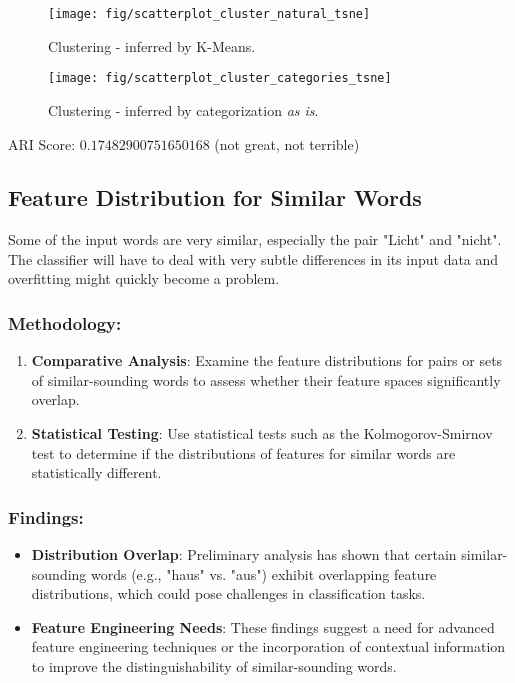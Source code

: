 \begin{figure}[!ht]
	\centering
	\begin{minipage}{0.49\textwidth}
		\centering
		\texttt{[image: fig/scatterplot\_cluster\_natural\_tsne]}
		\caption{Clustering - inferred by K-Means.}
		\label{fig:ClusterNatural}
	\end{minipage}\hfill
	\begin{minipage}{0.49\textwidth}
		\centering
		\texttt{[image: fig/scatterplot\_cluster\_categories\_tsne]}
		\caption{Clustering - inferred by categorization \textit{as is}.}
		\label{fig:ClusterCategorized}
	\end{minipage}
\end{figure}
ARI Score: $0.17482900751650168$ (not great, not terrible)

\subsection{Feature Distribution for Similar Words}

Some of the input words are very similar, especially the pair "Licht" and "nicht". The classifier will have to deal with very subtle differences in its input data and overfitting might quickly become a problem.

\subsubsection{Methodology:}

\begin{enumerate}
    \item \textbf{Comparative Analysis}: Examine the feature distributions for pairs or sets of similar-sounding words to assess whether their feature spaces significantly overlap.
    \item \textbf{Statistical Testing}: Use statistical tests such as the Kolmogorov-Smirnov test to determine if the distributions of features for similar words are statistically different.
\end{enumerate}

\subsubsection{Findings:}

\begin{itemize}
    \item \textbf{Distribution Overlap}: Preliminary analysis has shown that certain similar-sounding words (e.g., "haus" vs. "aus") exhibit overlapping feature distributions, which could pose challenges in classification tasks.
    \item \textbf{Feature Engineering Needs}: These findings suggest a need for advanced feature engineering techniques or the incorporation of contextual information to improve the distinguishability of similar-sounding words.
\end{itemize}
